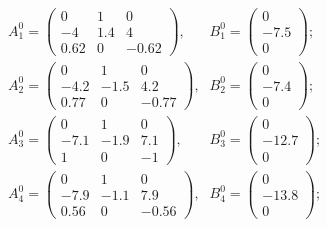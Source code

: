 \begin{equation*}
\begin{array}{lr}

A_1^0 = \left(\begin{array}{ccc}
0     &     1     &     0 \\
-4    &     1.4   &     4 \\
0.62  &     0     &     -0.62
\end{array}\right)\mbox{,} &
B_1^0 = \left(\begin{array}{c}
0 \\
-7.5 \\
0
\end{array}\right)\mbox{;} \\
A_2^0 = \left(\begin{array}{ccc}
0     &     1     &     0 \\
-4.2    &     -1.5   &     4.2 \\
0.77  &     0     &     -0.77
\end{array}\right)\mbox{,} &
B_2^0 = \left(\begin{array}{c}
0 \\
-7.4 \\
0
\end{array}\right)\mbox{;} \\
A_3^0 = \left(\begin{array}{ccc}
0     &     1     &     0 \\
-7.1    &     -1.9   &     7.1 \\
1  &     0     &     -1
\end{array}\right)\mbox{,} &
B_3^0 = \left(\begin{array}{c}
0 \\
-12.7 \\
0
\end{array}\right)\mbox{;} \\
A_4^0 = \left(\begin{array}{ccc}
0     &     1     &     0 \\
-7.9    &     -1.1   &     7.9 \\
0.56  &     0     &     -0.56
\end{array}\right)\mbox{,} &
B_4^0 = \left(\begin{array}{c}
0 \\
-13.8 \\
0
\end{array}\right)\mbox{;} \\

\end{array}
\end{equation*}
